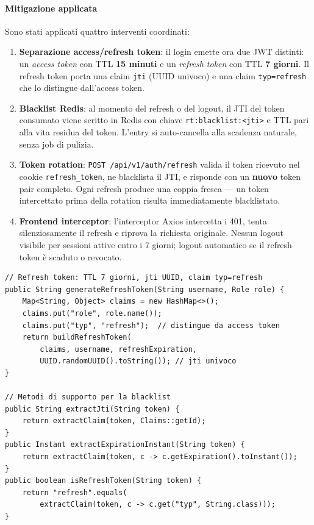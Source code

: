﻿\documentclass[a4paper,12pt]{report}
\begin{document}
\paragraph{Mitigazione applicata}
Sono stati applicati quattro interventi coordinati:

\begin{enumerate}
  \item \textbf{Separazione access/refresh token}: il login emette ora due JWT distinti:
        un \textit{access token} con TTL \textbf{15 minuti} e un \textit{refresh token} con
        TTL \textbf{7 giorni}. Il refresh token porta una claim \texttt{jti} (UUID univoco) e
        una claim \texttt{typ=refresh} che lo distingue dall'access token.
  \item \textbf{Blacklist Redis}: al momento del refresh o del logout, il JTI del token consumato
        viene scritto in Redis con chiave \texttt{rt:blacklist:<jti>} e TTL pari alla vita residua
        del token. L'entry si auto-cancella alla scadenza naturale, senza job di pulizia.
  \item \textbf{Token rotation}: \texttt{POST /api/v1/auth/refresh} valida il token ricevuto nel
        cookie \texttt{refresh\_token}, ne blacklista il JTI, e risponde con un \textbf{nuovo}
        token pair completo. Ogni refresh produce una coppia fresca --- un token intercettato
        prima della rotation risulta immediatamente blacklistato.
  \item \textbf{Frontend interceptor}: l'interceptor Axios intercetta i 401, tenta silenziosamente
        il refresh e riprova la richiesta originale. Nessun logout visibile per sessioni attive
        entro i 7 giorni; logout automatico se il refresh token è scaduto o revocato.
\end{enumerate}

\begin{securebox}[title={Codice Sicuro --- JwtService.java (generazione refresh token con jti)}]
\begin{lstlisting}[style=java]
// Refresh token: TTL 7 giorni, jti UUID, claim typ=refresh
public String generateRefreshToken(String username, Role role) {
    Map<String, Object> claims = new HashMap<>();
    claims.put("role", role.name());
    claims.put("typ", "refresh");  // distingue da access token
    return buildRefreshToken(
        claims, username, refreshExpiration,
        UUID.randomUUID().toString()); // jti univoco
}

// Metodi di supporto per la blacklist
public String extractJti(String token) {
    return extractClaim(token, Claims::getId);
}
public Instant extractExpirationInstant(String token) {
    return extractClaim(token, c -> c.getExpiration().toInstant());
}
public boolean isRefreshToken(String token) {
    return "refresh".equals(
        extractClaim(token, c -> c.get("typ", String.class)));
}
\end{lstlisting}
\end{securebox}
\end{document}
